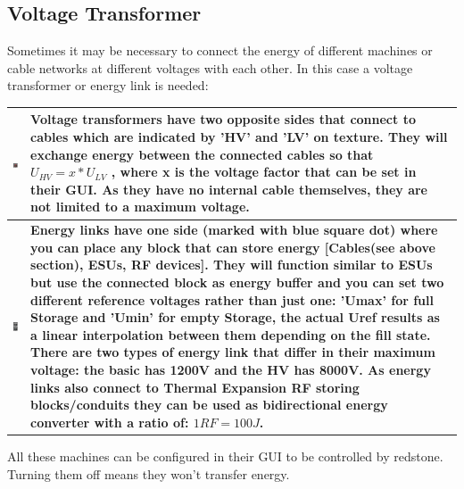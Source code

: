 \documentclass[11pt]{article} %
\makeatletter
\newcommand{\imgtex}{\begin{tabularx}{\textwidth}{@{}c@{ }X@{}}}
\makeatother
\begin{document}
\subsection{Voltage Transformer}
Sometimes it may be necessary to connect the energy of different machines or cable networks at different voltages with each other. In this case a voltage transformer or energy link is needed: \\
\imgtex \hline
\includegraphics[align = t]{blockTransformer} & \bf Voltage transformers \rm have two opposite sides that connect to cables which are indicated by 'HV' and 'LV' on texture. They will exchange energy between the connected cables so that ${U_{HV} = x * U_{LV}}$ , where x is the voltage factor that can be set in their GUI. As they have no internal cable themselves, they are not limited to a maximum voltage.\\ \hline
\includegraphics[align = t]{blockELink} & \bf Energy links \rm have one side (marked with blue square dot) where you can place any block that can store energy [Cables(see above section), ESUs, RF devices]. They will function similar to ESUs but use the connected block as energy buffer and you can set two different reference voltages rather than just one: 'Umax' for full Storage and 'Umin' for empty Storage, the actual Uref results as a linear interpolation between them depending on the fill state. There are two types of energy link that differ in their maximum voltage: the basic has 1200V and the HV has 8000V.  As energy links also connect to Thermal Expansion RF storing blocks/conduits they can be used as bidirectional energy converter with a ratio of: ${1RF = 100J}$. \\ \hline
\end{tabularx}
All these machines can be configured in their GUI to be controlled by redstone. Turning them off means they won't transfer energy.
\end{document}
